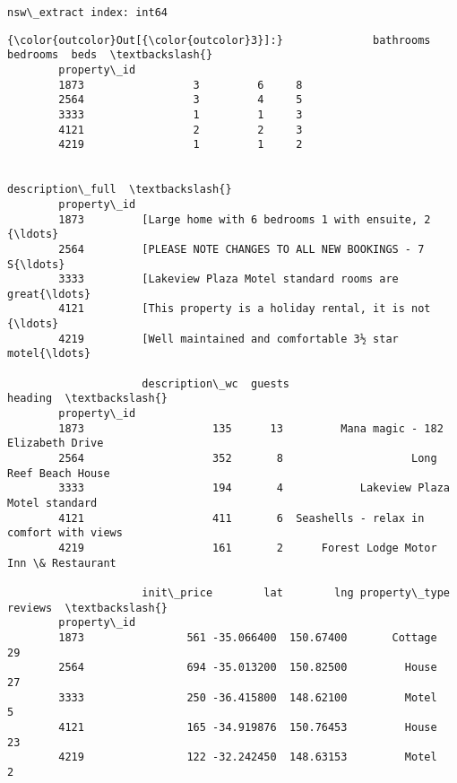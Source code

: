 \documentclass[11pt]{article}
\begin{document}
    \begin{Verbatim}[commandchars=\\\{\}]
nsw\_extract index: int64

    \end{Verbatim}

\begin{Verbatim}[commandchars=\\\{\}]
{\color{outcolor}Out[{\color{outcolor}3}]:}              bathrooms  bedrooms  beds  \textbackslash{}
        property\_id                              
        1873                 3         6     8   
        2564                 3         4     5   
        3333                 1         1     3   
        4121                 2         2     3   
        4219                 1         1     2   
        
                                                      description\_full  \textbackslash{}
        property\_id                                                      
        1873         [Large home with 6 bedrooms 1 with ensuite, 2 {\ldots}   
        2564         [PLEASE NOTE CHANGES TO ALL NEW BOOKINGS - 7 S{\ldots}   
        3333         [Lakeview Plaza Motel standard rooms are great{\ldots}   
        4121         [This property is a holiday rental, it is not {\ldots}   
        4219         [Well maintained and comfortable 3½ star motel{\ldots}   
        
                     description\_wc  guests                                  heading  \textbackslash{}
        property\_id                                                                    
        1873                    135      13         Mana magic - 182 Elizabeth Drive   
        2564                    352       8                    Long Reef Beach House   
        3333                    194       4            Lakeview Plaza Motel standard   
        4121                    411       6  Seashells - relax in comfort with views   
        4219                    161       2      Forest Lodge Motor Inn \& Restaurant   
        
                     init\_price        lat        lng property\_type  reviews  \textbackslash{}
        property\_id                                                            
        1873                561 -35.066400  150.67400       Cottage       29   
        2564                694 -35.013200  150.82500         House       27   
        3333                250 -36.415800  148.62100         Motel        5   
        4121                165 -34.919876  150.76453         House       23   
        4219                122 -32.242450  148.63153         Motel        2   
        

\end{Verbatim}
\end{document}
